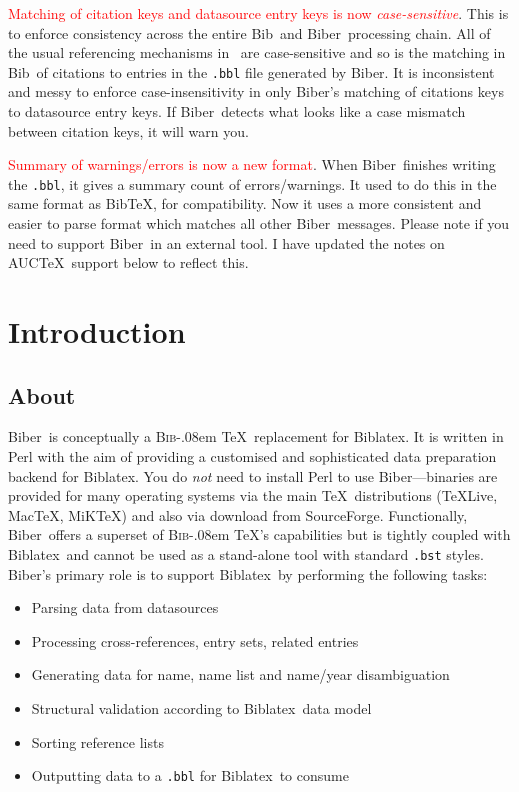 \documentclass{ltxdockit}
\def\BibTeX{\textsc{Bib}\kern-.08em \TeX}
\newcommand*{\biber}{Biber\xspace}
\newcommand*{\biblatex}{Biblatex\xspace}
\begin{document}
\textcolor{red}{Matching of citation keys and datasource entry keys is now
  \emph{case-sensitive}}. This is to enforce consistency across the entire
Bib\latex\ and \biber\ processing chain. All of the usual referencing
mechanisms in \latex\ are case-sensitive and so is the matching in
Bib\latex\ of citations to entries in the \texttt{.bbl} file generated by
\biber. It is inconsistent and messy to enforce case-insensitivity in only
\biber's matching of citations keys to datasource entry keys. If \biber\
detects what looks like a case mismatch between citation keys, it will warn
you.

\noindent \textcolor{red}{Summary of warnings/errors is now a new format}.
When \biber\ finishes writing the \verb+.bbl+, it gives a summary
count of errors/warnings. It used to do this in the same format as
Bib\TeX, for compatibility. Now it uses a more consistent and easier
to parse format which matches all other \biber\ messages. Please note
if you need to support \biber\ in an external tool. I have updated the
notes on AUC\TeX\ support below to reflect this.

\section{Introduction}\label{int}

\subsection{About}

\biber\ is conceptually a \BibTeX\ replacement for
\biblatex. It is written in Perl with the aim of providing a
customised and sophisticated data preparation backend for \biblatex.
You do \emph{not} need to install Perl to use \biber---binaries
are provided for many operating systems via the main \TeX\
distributions (\TeX Live, Mac\TeX, MiK\TeX) and also via download from SourceForge.
Functionally, \biber\ offers a superset of \BibTeX's capabilities but is
tightly coupled with \biblatex\ and cannot be used as a stand-alone tool
with standard \verb+.bst+ styles. \biber's primary role is to support
\biblatex\ by performing the following tasks:

\begin{itemize}
\item Parsing data from datasources
\item Processing cross-references, entry sets, related entries
\item Generating data for name, name list and name/year disambiguation
\item Structural validation according to \biblatex\ data model
\item Sorting reference lists
\item Outputting data to a \verb+.bbl+ for \biblatex\ to consume
\end{itemize}
\end{document}
